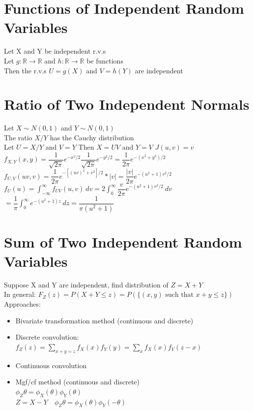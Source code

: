 \documentclass[openany]{book}
\begin{document}
\begin{flushleft}
\section{Functions of Independent Random Variables}
Let X and Y be independent r.v.s\\
Let $g:\mathbb{R}\to \mathbb{R}$ and $h:\mathbb{R}\to \mathbb{R}$ be functions\\
Then the r.v.s $U=g(X)$ and $V=h(Y)$ are independent
\section{Ratio of Two Independent Normals}
Let $X \sim N(0,1)$ and $Y\sim N(0,1)$\\
The ratio $X/Y$ has the Cauchy distribution\\
Let $U=X/Y$ and $V=Y$ \quad Then $X=UV$ and $Y=V$ \quad $J(u,v)=v$\\
$f_{X,Y}(x,y)=\dfrac{1}{\sqrt{2\pi}}e^{-x^2/2}\dfrac{1}{\sqrt{2\pi}}e^{-y^2/2}=\dfrac{1}{2\pi}e^{-(x^2+y^2)/2}$\\
$f_{U,V}(uv,v)=\dfrac{1}{2\pi}e^{-[(uv)^2+v^2]/2}*|v|=\dfrac{|v|}{2\pi}e^{-(u^2+1)v^2/2}$\\
$f_{U}(u)=\int_{-\infty}^{\infty}f_{UV}(u,v) \ dv=2\int_{0}^{\infty}\dfrac{v}{2\pi}e^{-(u^2+1)v^2/2} \ dv$\\
$=\dfrac{1}{\pi}\int_{0}^{\infty}e^{-(u^2+1)z} \ dz=\dfrac{1}{\pi(u^2+1)}$
\section{Sum of Two Independent Random Variables}
Suppose X and Y are independent, find distribution of $Z=X+Y$\\
In general: $F_Z(z)=P(X+Y\leq z)=P(\{(x,y) \text{ such that } x+y\leq z\})$\\
Approaches:
\begin{itemize}
\item Bivariate transformation method (continuous and discrete)\\
\item Discrete convolution:\\
$f_Z(z)=\sum_{x+y=z}f_X(x)f_Y(y)=\sum_{x}f_X(x)f_Y(z-x)$\\
\item Continuous convolution\\
\item Mgf/cf method (continuous and discrete)\\
$\phi_Z{\theta}=\phi_X(\theta)\phi_Y(\theta)$\\
$Z=X-Y \quad \phi_Z{\theta}=\phi_X(\theta)\phi_Y(-\theta)$
\end{itemize}

\end{flushleft}
\end{document}
